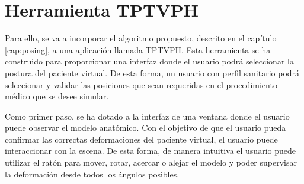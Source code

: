 \section{Herramienta \ac{TPTVPH}}
\label{rasim:posing}


%


Para ello,  se va a incorporar el algoritmo propuesto, descrito en el capítulo \ref{cap:posing}, a una aplicación llamada \ac{TPTVPH}. Esta herramienta se ha construido para proporcionar una interfaz donde el usuario podrá seleccionar la postura del paciente virtual. De esta forma, un usuario con perfil sanitario podrá seleccionar y validar las posiciones que sean requeridas en el procedimiento médico que se desee simular.



Como primer paso, se ha dotado a la interfaz de una ventana donde el usuario puede observar el modelo anatómico. Con el objetivo de que el usuario pueda confirmar las correctas deformaciones del paciente virtual, el usuario puede interaccionar con la escena. De esta forma, de manera intuitiva el usuario puede utilizar el ratón para mover, rotar, acercar o alejar el modelo y poder supervisar la deformación desde todos los ángulos posibles.

